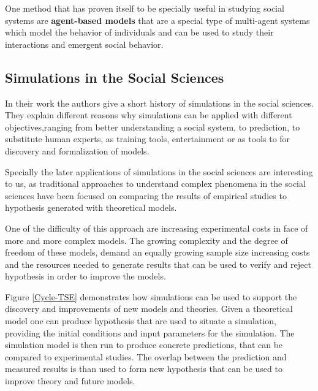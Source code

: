 \bb

One method that has proven itself to be specially useful in studying social systems are
\textbf{agent-based models}\cite{Jackson2017} that are a special type of multi-agent systems
which model the behavior of individuals and can be used to study their interactions
and emergent social behavior.

\subsection{Simulations in the Social Sciences}
In their work \cite{gilbert2005simulation} the authors give a short history of
simulations in the social sciences. They explain different reasons why simulations
can be applied with different objectives,ranging from better understanding a social
system, to prediction, to substitute human experts, as training tools, entertainment
or as tools to for discovery and formalization of models.

\bb

Specially the later applications of simulations in the social sciences are interesting
to us, as traditional approaches to understand complex phenomena in the social sciences
have been focused on comparing the results of empirical studies to hypothesis
generated with theoretical models.

One of the difficulty of this approach are increasing experimental costs
in face of more and more complex models. The growing complexity and the degree of
freedom of these models, demand an equally growing sample size increasing costs and the
resources needed to generate results that can be used to verify and reject hypothesis
in order to improve the models.

\bb

Figure \ref{Cycle-TSE} demonstrates how simulations can be used to support
the discovery and improvements of new models and theories. Given a theoretical model
one can produce hypothesis that are used to situate a simulation, providing the initial
conditions and input parameters for the simulation. The simulation model is then
run to produce concrete predictions, that can be compared to experimental studies.
The overlap between the prediction and measured results is than used to form new
hypothesis that can be used to improve theory and future models.


\begin{figure}[H]
\end{figure}

